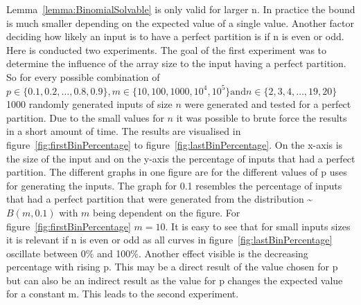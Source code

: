 Lemma~\ref{lemma:BinomialSolvable} is only valid for larger n. In practice the bound is much smaller depending on the expected value of a single value. Another factor deciding how likely an input is to have a perfect partition is if n is even or odd. Here is conducted two experiments. The goal of the first experiment was to determine the influence of the array size to the input having a perfect partition. So for every possible combination of $p \in \{0.1, 0.2, \dots , 0.8, 0.9\}, m \in \{10,100,1000,10^4,10^5\} \text{and} n \in \{2,3,4,\dots,19,20\}$ 1000 randomly generated inputs of size $n$ were generated and tested for a perfect partition. Due to the small values for $n$ it was possible to brute force the results in a short amount of time. The results are visualised in figure~\ref{fig:firstBinPercentage} to figure~\ref{fig:lastBinPercentage}. 
On the x-axis is the size of the input and on the y-axis the percentage of inputs that had a perfect partition. The different graphs in one figure are for the different values of p uses for generating the inputs. The graph for 0.1 resembles the percentage of inputs that had a perfect partition that were generated from the distribution \textasciitilde$B(m,0.1)$ with $m$ being dependent on the figure. For figure~\ref{fig:firstBinPercentage} $m=10$.\newline
It is easy to see that for small inputs sizes it is relevant if n is even or odd as all curves in figure~\ref{fig:lastBinPercentage} oscillate between 0\% and 100\%. Another effect visible is the decreasing percentage with rising p. This may be a direct result of the value chosen for p but can also be an indirect result as the value for p changes the expected value for a constant m. This leads to the second experiment.

